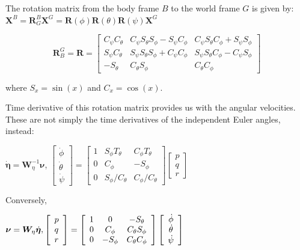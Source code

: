 The rotation matrix from the body frame $B$ to the world frame $G$ is given by:
$\mathbf{X}^{B}=\mathbf{R}_{G}^{B} \mathbf{X}^{G}=\mathbf{R}(\phi) \mathbf{R}(\theta) \mathbf{R}(\psi) \mathbf{X}^{G}$

$$\boldsymbol{R}_B^G=\boldsymbol{R}=\left[ \begin{array}{ccc}{C_{\psi} C_{\theta}} & {C_{\psi} S_{\theta} S_{\phi}-S_{\psi} C_{\phi}} & {C_{\psi} S_{\theta} C_{\phi}+S_{\psi} S_{\phi}} \\ {S_{\psi} C_{\theta}} & {S_{\psi} S_{\theta} S_{\phi}+C_{\psi} C_{\phi}} & {S_{\psi} S_{\theta} C_{\phi}-C_{\psi} S_{\phi}} \\ {-S_{\theta}} & {C_{\theta} S_{\phi}} & {C_{\theta} C_{\phi}}\end{array}\right]$$

where $S_{x}=\sin (x)$ and $C_{x}=\cos (x)$.

Time derivative of this rotation matrix provides us with the angular velocities. These are not simply the time derivatives of the independent Euler angles, instead:

$\dot{\boldsymbol{\eta}}=\boldsymbol{W}_{\eta}^{-1} \boldsymbol{\nu}$, \hfill $\left[ \begin{array}{c}{\dot{\phi}} \\ {\dot{\theta}} \\ {\dot{\psi}}\end{array}\right]=\left[ \begin{array}{ccc}{1} & {S_{\phi} T_{\theta}} & {C_{\phi} T_{\theta}} \\ {0} & {C_{\phi}} & {-S_{\phi}} \\ {0} & {S_{\phi} / C_{\theta}} & {C_{\phi} / C_{\theta}}\end{array}\right] \left[ \begin{array}{l}{p} \\ {q} \\ {r}\end{array}\right]$

Conversely,

$\boldsymbol{\nu}=\boldsymbol{W}_{\eta} \dot{\boldsymbol{\eta}}, \hfill \left[ \begin{array}{l}{p} \\ {q} \\ {r}\end{array}\right]=\left[ \begin{array}{ccc}{1} & {0} & {-S_{\theta}} \\ {0} & {C_{\phi}} & {C_{\theta} S_{\phi}} \\ {0} & {-S_{\phi}} & {C_{\theta} C_{\phi}}\end{array}\right] \left[ \begin{array}{c}{\dot{\phi}} \\ {\dot{\theta}} \\ {\dot{\psi}}\end{array}\right]$
  
